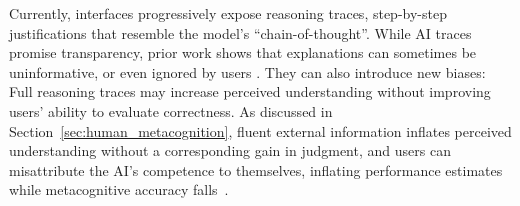 \documentclass[manuscript,review,anonymous]{acmart}
\begin{document}
Currently, interfaces progressively expose reasoning traces, step-by-step justifications that resemble the model's ``chain-of-thought''. While AI traces promise transparency, prior work shows that explanations can sometimes be uninformative, or even ignored by users \cite{vasconcelos2023explanations, wang2021explanations}. They can also introduce new biases: Full reasoning traces may increase perceived understanding without improving users' ability to evaluate correctness. As discussed in Section~\ref{sec:human_metacognition}, fluent external information inflates perceived understanding without a corresponding gain in judgment, and users can misattribute the AI's competence to themselves, inflating performance estimates while metacognitive accuracy falls~\cite{tankelevitch2023metacognitive}.


\end{document}
